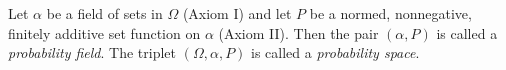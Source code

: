 Let $\alpha$ be a field of sets in $\Omega$ (Axiom I) and let $P$ be a normed, nonnegative, finitely additive set function on $\alpha$ (Axiom II). Then the pair $(\alpha, P)$ is called a \textit{probability field}. The triplet $(\Omega, \alpha, P)$ is called a \textit{probability space}.

